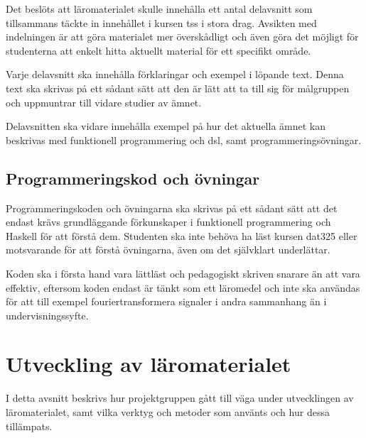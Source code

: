 \documentclass[12pt,a4paper,twoside,openright]{article}
\begin{document}
Det beslöts att läromaterialet skulle innehålla ett antal delavsnitt
som tillsammans täckte in innehållet i kursen \gls{tss} i stora drag.
Avsikten med indelningen är att göra materialet mer överskådligt och
även göra det möjligt för studenterna att enkelt hitta aktuellt
material för ett specifikt område.

Varje delavsnitt ska innehålla förklaringar och exempel i löpande
text.  Denna text ska skrivas på ett sådant sätt att den är lätt att
ta till sig för målgruppen och uppmuntrar till vidare studier av
ämnet.

Delavsnitten ska vidare innehålla exempel på hur det aktuella ämnet
kan beskrivas med funktionell programmering och \gls{dsl}, samt
programmeringsövningar.

\subsection{Programmeringskod och övningar}

Programmeringskoden och övningarna ska skrivas på ett sådant sätt att
det endast krävs grundläggande förkunskaper i funktionell
programmering och Haskell för att förstå dem. Studenten ska inte
behöva ha läst kursen \gls{dat325} eller motsvarande för att förstå
övningarna, även om det självklart underlättar.

Koden ska i första hand vara lättläst och pedagogiskt skriven snarare
än att vara effektiv, eftersom koden endast är tänkt som ett läromedel
och inte ska användas för att till exempel fouriertransformera
signaler i andra sammanhang än i undervisningssyfte.

\newpage


\section{Utveckling av läromaterialet}
\label{sec:utveckling}


I detta avsnitt beskrivs hur projektgruppen gått till väga under
utvecklingen av läromaterialet, samt vilka verktyg och metoder som
använts och hur dessa tillämpats.
\end{document}
